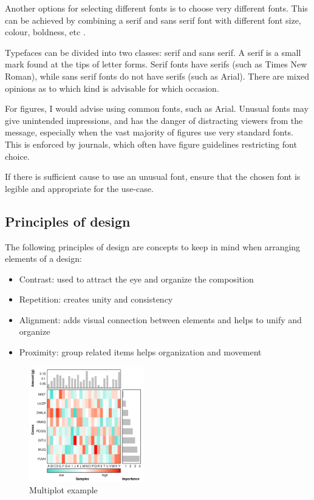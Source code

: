 \documentclass[letterpaper]{article}\usepackage[]{graphicx}\usepackage[]{color}
\begin{document}
Another options for selecting different fonts is to choose very different fonts. This can be achieved by combining a serif and sans serif font with different font size, colour, boldness, etc \cite{williams}.

Typefaces can be divided into two classes: serif and \textsf{sans serif}. A serif is a small mark found at the tips of letter forms. Serif fonts have serifs (such as Times New Roman), while \textsf{sans serif} fonts do not have serifs (such as Arial). There are mixed opinions as to which kind is advisable for which occasion.

For figures, I would advise using common fonts, such as Arial. Unusual fonts may give unintended impressions, and has the danger of distracting viewers from the message, especially when the vast majority of figures use very standard fonts. This is enforced by journals, which often have figure guidelines restricting font choice. 

If there is sufficient cause to use an unusual font, ensure that the chosen font is legible and appropriate for the use-case. 

\subsection{Principles of design}
The following principles of design are concepts to keep in mind when arranging elements of a design: \cite{williams}
\begin{itemize}
\item Contrast: used to attract the eye and organize the composition
\item Repetition: creates unity and consistency
\item Alignment: adds visual connection between elements and helps to unify and organize
\item Proximity: group related items helps organization and movement
\end{itemize}

\begin{figure}[!ht]
  \begin{center}
     \includegraphics[width=50mm]{Figures/Multiplot_Ex2.png}
     \caption{Multiplot example}
  \end{center}
\end{figure}
\end{document}
